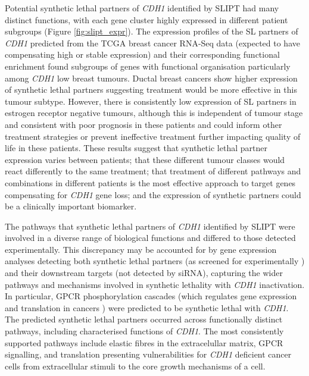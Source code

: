 Potential synthetic lethal partners of \textit{CDH1} identified by SLIPT had many distinct functions, with each gene cluster highly expressed in different patient subgroups (Figure \ref{fig:slipt_expr}). The expression profiles of the SL partners of \textit{CDH1} predicted from the TCGA breast cancer RNA-Seq data (expected to have compensating high or stable expression) and their corresponding functional enrichment found subgroups of genes with functional organisation particularly among \textit{CDH1} low breast tumours.  Ductal breast cancers show higher expression of synthetic lethal partners suggesting treatment would be more effective in this tumour subtype.  However, there is consistently low expression of SL partners in estrogen receptor negative tumours, although this is independent of tumour stage and consistent with poor prognosis in these patients and could inform other treatment strategies or prevent ineffective treatment further impacting quality of life in these patients.  These results suggest that synthetic lethal partner expression varies between patients; that these different tumour classes would react differently to the same treatment; that treatment of different pathways and combinations in different patients is the most effective approach to target genes compensating for \textit{CDH1} gene loss; and the expression of synthetic partners could be a clinically important biomarker.  

The pathways that synthetic lethal partners of \textit{CDH1} identified by SLIPT were involved in a diverse range of biological functions and differed to those detected experimentally. This discrepancy may be accounted for by gene expression analyses detecting both synthetic lethal partners (as screened for experimentally \cite{Telford2015}) and their downstream targets (not detected by siRNA), capturing the wider pathways and mechanisms involved in synthetic lethality with \textit{CDH1} inactivation. In particular, GPCR phosphorylation cascades (which regulates gene expression and translation in cancers \cite{Gao2015}) were predicted to be synthetic lethal with \textit{CDH1}. The predicted synthetic lethal partners occurred across functionally distinct pathways, including characterised functions of \textit{CDH1}. The most consistently supported pathways include elastic fibres in the extracelullar matrix, GPCR signalling, and translation presenting vulnerabilities for \textit{CDH1} deficient cancer cells from extracellular stimuli to the core growth mechanisms of a cell.

